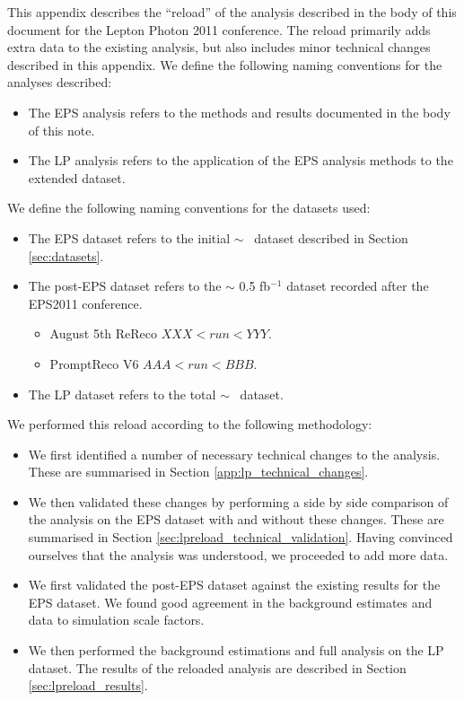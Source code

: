 
This appendix describes the ``reload'' of the analysis described in the body
of this document for the Lepton Photon 2011 conference.
The reload primarily adds extra data to the existing analysis, but also 
includes minor technical changes described in this appendix.
We define the following naming conventions for the analyses described:

\begin{itemize}
    \item The EPS analysis refers to the methods and results documented in the body of this note.
    \item The LP analysis refers to the application of the EPS analysis methods to the extended dataset.
\end{itemize}

We define the following naming conventions for the datasets used:

\begin{itemize}
    \item The EPS dataset refers to the initial $\sim$ \intlumi~dataset described in Section \ref{sec:datasets}.
    \item The post-EPS dataset refers to the $\sim$ 0.5 fb$^{-1}$ dataset recorded after the EPS2011 conference.
    \begin{itemize}
        \item August 5th ReReco $XXX<run<YYY$.
        \item PromptReco V6 $AAA<run<BBB$.
    \end{itemize}
    \item The LP dataset refers to the total $\sim$ \lpintlumi~dataset.
\end{itemize}

We performed this reload according to the following methodology:

\begin{itemize}
    \item We first identified a number of necessary technical changes to the analysis.  
These are summarised in Section \ref{app:lp_technical_changes}.
    \item We then validated these changes by performing a side by side comparison of 
the analysis on the EPS dataset with and without these changes.
These are summarised in Section \ref{sec:lpreload_technical_validation}.
Having convinced ourselves that the analysis was understood, we proceeded to add more data.
    \item We first validated the post-EPS dataset against the existing results for the EPS dataset.
We found good agreement in the background estimates and data to simulation scale factors.
    \item We then performed the background estimations and full analysis on the LP dataset.
The results of the reloaded analysis are described in Section \ref{sec:lpreload_results}.
\end{itemize}

